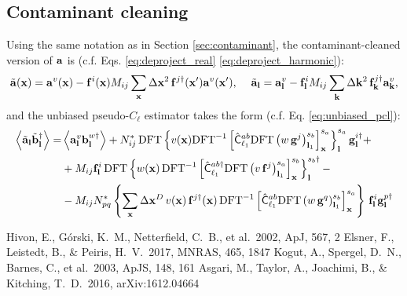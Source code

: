 \documentclass[a4paper,10pt]{article}
\newcommand{\apj}{ApJ}
\newcommand{\apjs}{ApJS}
\newcommand{\mnras}{MNRAS}
\begin{document}
  \subsection{Contaminant cleaning}
    Using the same notation as in Section \ref{sec:contaminant}, the contaminant-cleaned version of ${\bf a}$ is (c.f. Eqs. \ref{eq:deproject_real} \ref{eq:deproject_harmonic}):
    \begin{equation}
      \tilde{\bf a}({\bf x})={\bf a}^v({\bf x})-{\bf f}^i({\bf x})M_{ij}\sum_{\bf x}\Delta{\bf x}^2\,{\bf f}^{j\dag}({\bf x}'){\bf a}^v({\bf x}'),\hspace{12pt}
      \tilde{\bf a}_{\bf l}={\bf a}^v_{\bf l}-{\bf f}^i_{\bf l}M_{ij}\sum_{\bf k}\Delta{\bf k}^2\,{\bf f}^{j\dag}_{\bf k}{\bf a}^v_{\bf k},
    \end{equation}
    and the unbiased pseudo-$C_\ell$ estimator takes the form (c.f. Eq. \ref{eq:unbiased_pcl}):
    \begin{align}\nonumber
      \left\langle\tilde{\bf a}_{\bf l}\tilde{\bf b}_{\bf l}^\dag\right\rangle=&\left\langle{\bf a}^v_{\bf l}{\bf b}^{w\dag}_{\bf l}\right\rangle+N^*_{ij}\,{\rm DFT}\left\{v({\bf x}){\rm DFT}^{-1}\left[\hat{\sf C}^{ab}_{\ell_1}{\rm DFT}\left(w\,{\bf g}^j\right)^{s_b}_{{\bf l}_1}\right]^{s_a}_{\bf x}\right\}^{s_a}_{\bf l}{\bf g}^{i\dag}_{\bf l}+\\\nonumber
      &+M_{ij}{\bf f}^i_{\bf l}\,{\rm DFT}\left\{w({\bf x})\,{\rm DFT}^{-1}\left[\hat{\sf C}^{ab\dag}_{\ell_1}{\rm DFT}\left(v\,{\bf f}^j\right)^{s_a}_{{\bf l}_1}\right]^{s_b}_{\bf x}\right\}^{s_b\dag}_{\bf l}-\\
      &-M_{ij}N^*_{pq}\left\{\sum_{\bf x} \Delta{\bf x}^D\,v({\bf x})\,{\bf f}^{j\dag}({\bf x})\,{\rm DFT}^{-1}\left[\hat{\sf C}^{ab}_{\ell_1}{\rm DFT}\left(w\,{\bf g}^q\right)^{s_b}_{{\bf l}_1}\right]^{s_a}_{\bf x}\right\}\,{\bf f}^i_{\bf l}{\bf g}^{p\dag}_{\bf l}
    \end{align}
  
\begin{thebibliography}{}
  Hivon, E., G{\'o}rski, K.~M., Netterfield, C.~B., et al.\ 2002, \apj, 567, 2 
  Elsner, F., Leistedt, B., \& Peiris, H.~V.\ 2017, \mnras, 465, 1847 
  Kogut, A., Spergel, D.~N., Barnes, C., et al.\ 2003, \apjs, 148, 161 
  Asgari, M., Taylor, A., Joachimi, B., \& Kitching, T.~D.\ 2016, arXiv:1612.04664 
\end{thebibliography}
\end{document}
